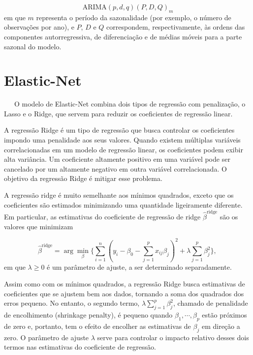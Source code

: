 \documentclass[
  12pt,
  a4paper,
]{scrreprt}
\begin{document}
\[
\text{ARIMA}\left(p, d, q\right)\left(P, D, Q\right)_m
\] em que \(m\) representa o período da sazonalidade (por exemplo, o
número de observações por ano), e \(P\), \(D\) e \(Q\) correspondem,
respectivamente, às ordens das componentes autorregressiva, de
diferenciação e de médias móveis para a parte sazonal do modelo.

\section{Elastic-Net}\label{elastic-net}

~~~O modelo de Elastic-Net combina dois tipos de regressão com
penalização, o Lasso e o Ridge, que servem para reduzir os coeficientes
de regressão linear.

\vspace{12pt}

A regressão Ridge é um tipo de regressão que busca controlar os
coeficientes impondo uma penalidade aos seus valores. Quando existem
múltiplas variáveis correlacionadas em um modelo de regressão linear, os
coeficientes podem exibir alta variância. Um coeficiente altamente
positivo em uma variável pode ser cancelado por um altamente negativo em
outra variável correlacionada. O objetivo da regressão Ridge é mitigar
esse problema.

\vspace{12pt}

A regressão ridge é muito semelhante aos mínimos quadrados, exceto que
os coeficientes são estimados minimizando uma quantidade ligeiramente
diferente. Em particular, as estimativas do coeficiente de regressão de
ridge \(\hat{\beta}^{\text{ridge}}\) são os valores que minimizam

\[
\hat{\beta}^{\text{ridge}} = \arg \min_{\beta} \Biggl\{\sum_{i = 1}^{n}\left(y_{i} - \beta_{0} - \sum_{j=1}^{p}x_{ij}\beta_{j}\right)^2 + \lambda \sum_{j=1}^{p}\beta_{j}^2 \Biggl\}\text{, }
\] em que \(\lambda \geq 0\) é um parâmetro de ajuste, a ser determinado
separadamente.

\vspace{12pt}

Assim como com os mínimos quadrados, a regressão Ridge busca estimativas
de coeficientes que se ajustem bem aos dados, tornando a soma dos
quadrados dos erros pequeno. No entanto, o segundo termo,
\(\lambda \sum_{j=1}^{p}\beta_{j}^2\), chamado de penalidade de
encolhimento (shrinkage penalty), é pequeno quando
\(\beta_{1}, \cdots, \beta_{p}\) estão próximos de zero e, portanto, tem
o efeito de encolher as estimativas de \(\beta_j\) em direção a zero. O
parâmetro de ajuste \(\lambda\) serve para controlar o impacto relativo
desses dois termos nas estimativas do coeficiente de regressão.
\end{document}
